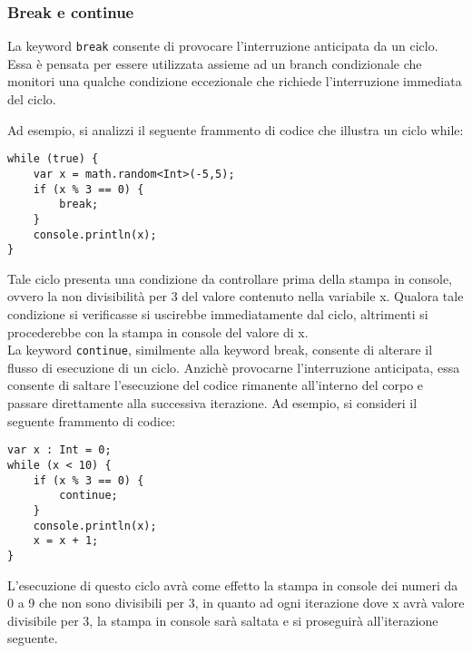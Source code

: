 \subsubsection{Break e continue}
La keyword \texttt{break} consente di provocare l’interruzione anticipata da un ciclo. Essa è pensata per essere utilizzata assieme ad un branch condizionale 
che monitori una qualche condizione eccezionale che richiede l’interruzione immediata del ciclo.

Ad esempio, si analizzi il seguente frammento di codice che illustra un ciclo while:

\vspace{0.5cm}
\begin{lstlisting}[frame=single]
while (true) {
    var x = math.random<Int>(-5,5);
    if (x % 3 == 0) {
        break;
    }
    console.println(x);
}
\end{lstlisting}
\vspace{0.5cm}

Tale ciclo presenta una condizione da controllare prima della stampa in console, ovvero la non divisibilità per 3 del valore contenuto nella variabile x. 
Qualora tale condizione si verificasse si uscirebbe immediatamente dal ciclo, altrimenti si procederebbe con la stampa in console del valore di x. \\

La keyword \texttt{continue}, similmente alla keyword break, consente di alterare il flusso di esecuzione di un ciclo. Anzichè provocarne 
l’interruzione anticipata, essa consente di saltare l’esecuzione del codice rimanente all’interno del corpo e passare direttamente alla 
successiva iterazione. Ad esempio, si consideri il seguente frammento di codice:

\vspace{0.5cm}
\begin{lstlisting}[frame=single]
var x : Int = 0;
while (x < 10) {
    if (x % 3 == 0) {
        continue;
    }
    console.println(x);
    x = x + 1;
}
\end{lstlisting}
\vspace{0.5cm}

L’esecuzione di questo ciclo avrà come effetto la stampa in console dei numeri da 0 a 9 che non sono divisibili per 3, 
in quanto ad ogni iterazione dove x avrà valore divisibile per 3,  la stampa in console sarà saltata e si 
proseguirà all’iterazione seguente.